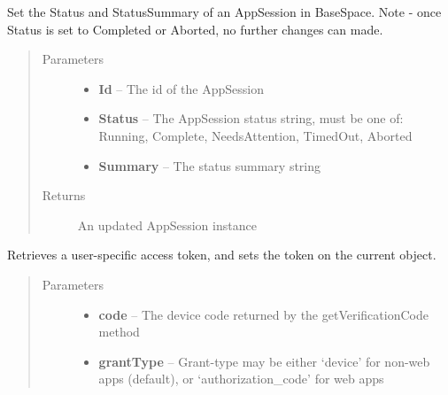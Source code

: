 \documentclass[letterpaper,10pt,english]{sphinxmanual}
\begin{document}
\begin{fulllineitems}
\begin{fulllineitems}
\label{Available modules:BaseSpacePy.api.BaseSpaceAPI.BaseSpaceAPI.setAppSessionState}
Set the Status and StatusSummary of an AppSession in BaseSpace.
Note - once Status is set to Completed or Aborted, no further changes can made.
\begin{quote}\begin{description}
\item[{Parameters}] \leavevmode\begin{itemize}
\item {} 
\textbf{Id} -- The id of the AppSession

\item {} 
\textbf{Status} -- The AppSession status string, must be one of: Running, Complete, NeedsAttention, TimedOut, Aborted

\item {} 
\textbf{Summary} -- The status summary string

\end{itemize}

\item[{Returns}] \leavevmode
An updated AppSession instance

\end{description}\end{quote}

\end{fulllineitems}


\begin{fulllineitems}
\label{Available modules:BaseSpacePy.api.BaseSpaceAPI.BaseSpaceAPI.updatePrivileges}
Retrieves a user-specific access token, and sets the token on the current object.
\begin{quote}\begin{description}
\item[{Parameters}] \leavevmode\begin{itemize}
\item {} 
\textbf{code} -- The device code returned by the getVerificationCode method

\item {} 
\textbf{grantType} -- Grant-type may be either `device' for non-web apps (default), or `authorization\_code' for web apps


\end{itemize}
\end{description}
\end{quote}
\end{fulllineitems}
\end{fulllineitems}
\end{document}
